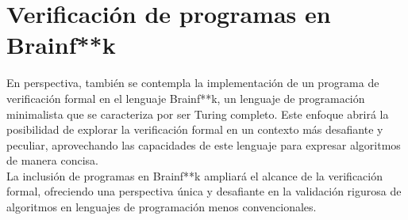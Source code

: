 \documentclass{hw-template}
\begin{document}
\section{Verificación de programas en Brainf**k}
En perspectiva, también se contempla la implementación de un programa de
verificación formal en el lenguaje Brainf**k, un lenguaje de programación
minimalista que se caracteriza por ser Turing completo. Este enfoque abrirá
la posibilidad de explorar la verificación formal en un contexto más
desafiante y peculiar, aprovechando las capacidades de este lenguaje para
expresar algoritmos de manera concisa. \\

La inclusión de programas en Brainf**k ampliará el alcance de la verificación
formal, ofreciendo una perspectiva única y desafiante en la validación 
rigurosa de algoritmos en lenguajes de programación menos convencionales.

\printbibliography
\end{document}
